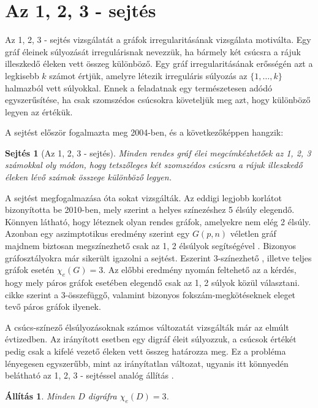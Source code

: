 \documentclass[12pt, a4paper]{report}
\newtheorem{áll}[tét]{Állítás}
\newtheorem{sej}[tét]{Sejtés}
\theoremstyle{remark}
\theoremstyle{definition}
\begin{document}
\section{Az 1, 2, 3 - sejtés}
Az 1, 2, 3 - sejtés vizsgálatát a gráfok irregularitásának vizsgálata motiválta. Egy gráf éleinek súlyozását irregulárisnak nevezzük, ha bármely két csúcsra a rájuk illeszkedő éleken vett összeg különböző. Egy gráf irregularitásának erősségén azt a legkisebb $k$ számot értjük, amelyre létezik irreguláris súlyozás az $\lbrace 1, \ldots, k \rbrace$ halmazból vett súlyokkal. Ennek a feladatnak egy természetesen adódó egyszerűsítése, ha csak szomszédos csúcsokra követeljük meg azt, hogy különböző legyen az értékük. 

A sejtést először \citeauthor{Karonski2004} \cite{Karonski2004} fogalmazta meg 2004-ben, és a következőképpen hangzik: 

\begin{sej}[Az 1, 2, 3 - sejtés]
Minden rendes gráf élei megcímkézhetőek az 1, 2, 3 számokkal oly módon, hogy tetszőleges két szomszédos csúcsra a rájuk illeszkedő éleken lévő számok összege különböző legyen.
\end{sej}

A sejtést megfogalmazása óta sokat vizsgálták. Az eddigi legjobb korlátot \citeauthor{Kalkowski2010} \cite{Kalkowski2010} bizonyította be 2010-ben, mely szerint a helyes színezéshez 5 élsúly elegendő. Könnyen látható, hogy léteznek olyan rendes gráfok, amelyekre nem elég 2 élsúly. Azonban egy aszimptotikus eredmény szerint egy $G(p, n)$ véletlen gráf majdnem biztosan megszínezhető csak az 1, 2 élsúlyok segítségével \cite{AddarioBerry2008}. Bizonyos gráfosztályokra már sikerült igazolni a sejtést. Eszerint 3-színezhető \cite{Karonski2004}, illetve teljes gráfok \cite{Alaeiyan2012} esetén $\chi_e(G) = 3$. Az előbbi eredmény nyomán feltehető az a kérdés, hogy mely páros gráfok esetében elegendő csak az 1, 2 súlyok közül választani. \citeauthor{Lu2011} \cite{Lu2011} cikke szerint a 3-összefüggő, valamint bizonyos fokszám-megkötéseknek eleget tevő páros gráfok ilyenek.

A csúcs-színező élsúlyozásoknak számos változatát vizsgálták már az elmúlt évtizedben. Az irányított esetben egy digráf éleit súlyozzuk, a csúcsok értékét pedig csak a kifelé vezető éleken vett összeg határozza meg. Ez a probléma lényegesen egyszerűbb, mint az irányítatlan változat, ugyanis itt könnyedén belátható az 1, 2, 3 - sejtéssel analóg állítás \cite{Baudon2014}.

\begin{áll}
Minden $D$ digráfra $\chi_e(D) = 3$.
\end{áll}
\end{document}
